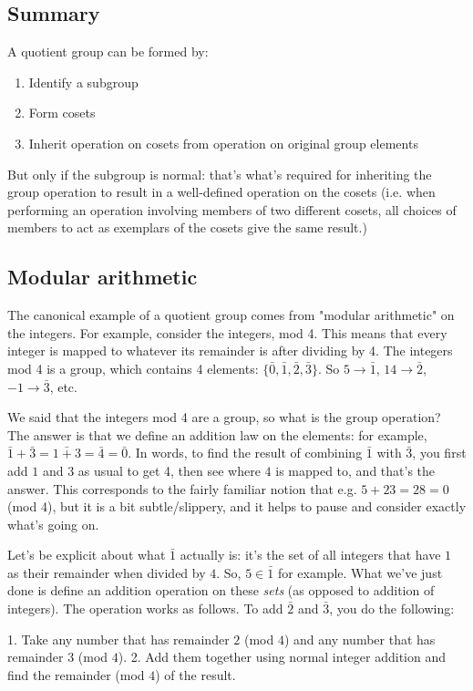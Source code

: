 \subsection{Summary}
A quotient group can be formed by:
\begin{enumerate}
\item Identify a subgroup
\item Form cosets
\item Inherit operation on cosets from operation on original group elements
\end{enumerate}
But only if the subgroup is normal: that's what's required for inheriting the group operation to
result in a well-defined operation on the cosets (i.e. when performing an operation involving
members of two different cosets, all choices of members to act as exemplars of the cosets give the
same result.)

\subsection{Modular arithmetic}

The canonical example of a quotient group comes from "modular arithmetic" on
the integers. For example, consider the integers, mod 4. This means that every
integer is mapped to whatever its remainder is after dividing by 4. The
integers mod 4 is a group, which contains 4 elements: $\{\bar 0, \bar 1, \bar
2, \bar 3\}$. So $5 \rightarrow \bar 1$, $14 \rightarrow \bar 2$, $-1
\rightarrow \bar 3$, etc.

We said that the integers mod 4 are a group, so what is the group operation?
The answer is that we define an addition law on the elements: for example,
$\bar 1 + \bar 3 = \bar{1 + 3} = \bar 4 = \bar 0$. In words, to find the result
of combining $\bar 1$ with $\bar 3$, you first add $1$ and $3$ as usual to get
4, then see where $4$ is mapped to, and that's the answer. This corresponds to
the fairly familiar notion that e.g. $5 + 23 = 28 = 0$ (mod 4), but it is a bit
subtle/slippery, and it helps to pause and consider exactly what's going on.

Let's be explicit about what $\bar 1$ actually is: it's the set of all integers
that have $1$ as their remainder when divided by $4$. So, $5 \in \bar 1$ for
example. What we've just done is define an addition operation on these
\emph{sets} (as opposed to addition of integers). The operation works as
follows. To add $\bar 2$ and $\bar 3$, you do the following:

1. Take any number that has remainder $2$ (mod $4$) and any number that has
   remainder $3$ (mod $4$).
2. Add them together using normal integer addition and find the remainder (mod
   $4$) of the result.

